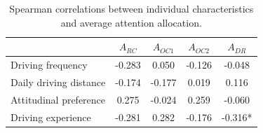\begin{table}[ht]
\caption{Spearman correlations between individual characteristics and average attention allocation.}
\label{tab:attention_covariate_correlations}
\begin{tabular}{lcccc}
\toprule
 & $A_{RC}$ & $A_{OC1}$ & $A_{OC2}$ & $A_{DR}$ \\
\midrule
Driving frequency & -0.283 & 0.050 & -0.126 & -0.048 \\
Daily driving distance & -0.174 & -0.177 & 0.019 & 0.116 \\
Attitudinal preference & 0.275 & -0.024 & 0.259 & -0.060 \\
Driving experience & -0.281 & 0.282 & -0.176 & -0.316* \\
\bottomrule
\end{tabular}
\end{table}

